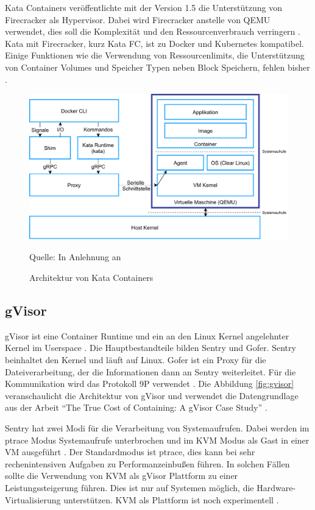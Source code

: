 Kata Containers veröffentlichte mit der Version 1.5 die Unterstützung von Firecracker als Hypervisor. Dabei wird Firecracker anstelle von \ac{QEMU} verwendet, dies soll die Komplexität und den Ressourcenverbrauch verringern \cite[vgl.][11]{Randal.28.04.2019}.
Kata mit Firecracker, kurz Kata FC, ist zu Docker und Kubernetes kompatibel. Einige Funktionen wie die Verwendung von Ressourcenlimits, die Unterstützung von Container Volumes und Speicher Typen neben Block Speichern, fehlen bisher \cite[vgl.][]{katacontainers.20190123}. 

\begin{figure}[ht]
	\centering
	\includegraphics[width=1\linewidth]{gfx/kata_arch.pdf}
	\caption{Architektur von Kata Containers}
	\footnotesize Quelle: In Anlehnung an \cite[vgl.][ab 12:35]{NilsMagnus.20190425}
	\label{fig:kata}
\end{figure}

\subsection{gVisor}
\label{gvisor}
gVisor ist eine Container Runtime und ein an den Linux Kernel angelehnter Kernel im Userspace \cite[vgl.][6]{Scholl.2019}. 
Die Hauptbestandteile bilden Sentry und Gofer. Sentry beinhaltet den Kernel und läuft auf Linux. Gofer ist ein Proxy für die Dateiverarbeitung, der die Informationen dann an Sentry weiterleitet. Für die Kommunikation wird das Protokoll 9P verwendet \cite[vgl.][108]{UdoSeidel.2018}.
Die Abbildung \ref{fig:gvisor} veranschaulicht die Architektur von gVisor und verwendet die Datengrundlage aus der Arbeit "`The True Cost of Containing: A gVisor Case Study"' \cite[vgl.][]{EthanG.Young.2019}.

Sentry hat zwei Modi für die Verarbeitung von Systemaufrufen. Dabei werden im ptrace Modus Systemaufrufe unterbrochen und im \ac{KVM} Modus als Gast in einer \ac{VM} ausgeführt \cite[vgl.][2]{EthanG.Young.2019}.
Der Standardmodus ist ptrace, dies kann bei sehr rechenintensiven Aufgaben zu Performanzeinbußen führen. In solchen Fällen sollte die Verwendung von \ac{KVM} als gVisor Plattform zu einer Leistungssteigerung führen. Dies ist nur auf Systemen möglich, die Hardware-Virtualisierung unterstützen. \ac{KVM} als Plattform ist noch experimentell \cite[vgl.][109]{UdoSeidel.2018}.

